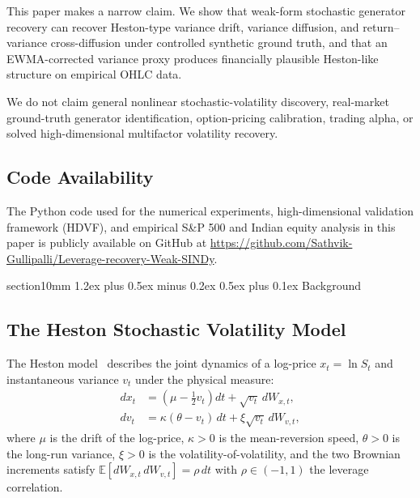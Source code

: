 \documentclass[reprint, amsmath, amssymb, aps, prl, superscriptaddress, nofootinbib]{revtex4-2}
\makeatletter
\def\section{\@startsection
  {section}{1}{0mm}
  {1.2ex plus 0.5ex minus 0.2ex}
  {0.5ex plus 0.1ex}
  {\centering\normalfont\small\bfseries}}
\makeatother
\begin{document}
This paper makes a narrow claim. We show that weak-form stochastic generator recovery can recover Heston-type variance drift, variance diffusion, and return--variance cross-diffusion under controlled synthetic ground truth, and that an EWMA-corrected variance proxy produces financially plausible Heston-like structure on empirical OHLC data.

We do not claim general nonlinear stochastic-volatility discovery, real-market ground-truth generator identification, option-pricing calibration, trading alpha, or solved high-dimensional multifactor volatility recovery.

\subsection{Code Availability}
The Python code used for the numerical experiments, high-dimensional validation framework (HDVF), and empirical S\&P 500 and Indian equity analysis in this paper is publicly available on GitHub at \url{https://github.com/Sathvik-Gullipalli/Leverage-recovery-Weak-SINDy}.



\section{Background}
\label{sec:Background}


\subsection{The Heston Stochastic Volatility Model}

The Heston model~\cite{Heston1993} describes the joint dynamics of a log-price
$x_t = \ln S_t$ and instantaneous variance $v_t$ under the physical measure:
\begin{align}
  dx_t &= \left(\mu - \tfrac{1}{2}v_t\right)dt + \sqrt{v_t}\,dW_{x,t},
  \label{eq:heston_x}\\
  dv_t &= \kappa(\theta - v_t)\,dt + \xi\sqrt{v_t}\,dW_{v,t},
  \label{eq:heston_v}
\end{align}
where $\mu$ is the drift of the log-price, $\kappa > 0$ is the mean-reversion speed,
$\theta > 0$ is the long-run variance, $\xi > 0$ is the volatility-of-volatility,
and the two Brownian increments satisfy
$\mathbb{E}[dW_{x,t}\,dW_{v,t}] = \rho\,dt$ with $\rho \in (-1,1)$ the leverage
correlation.
\end{document}
